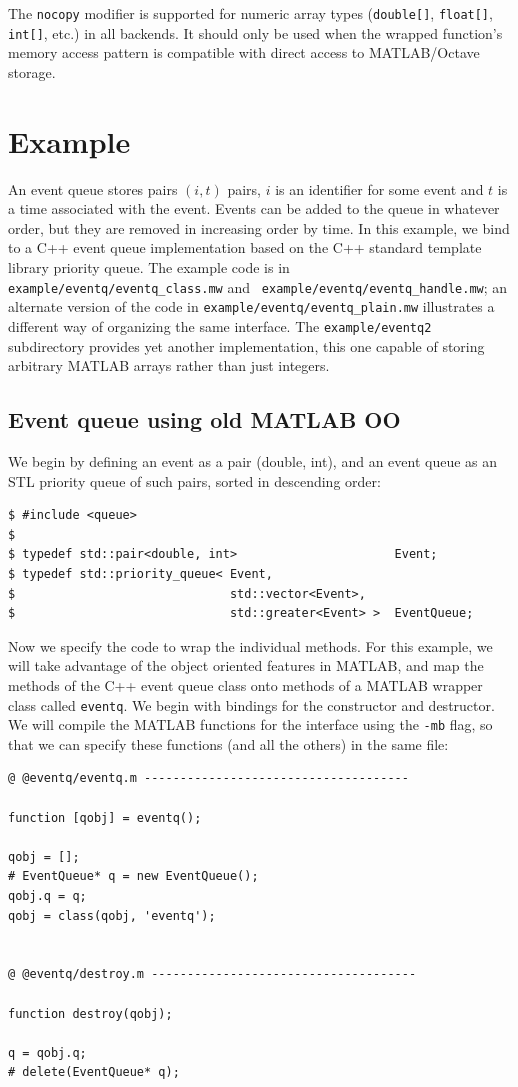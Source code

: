 \documentclass[12pt]{article}
\begin{document}
The {\tt nocopy} modifier is supported for numeric array types
({\tt double[]}, {\tt float[]}, {\tt int[]}, etc.) in all backends.
It should only be used when the wrapped function's memory access
pattern is compatible with direct access to MATLAB/Octave storage.


\section{Example}

An event queue stores pairs $(i, t)$ pairs, $i$ is an identifier for
some event and $t$ is a time associated with the event.  Events can be
added to the queue in whatever order, but they are removed in
increasing order by time.  In this example, we bind to a C++ event
queue implementation based on the C++ standard template library
priority queue.  The example code is in {\tt
  example/eventq/eventq\_class.mw} and {\tt
  example/eventq/eventq\_handle.mw}; an alternate version of the code
in {\tt example/eventq/eventq\_plain.mw} illustrates a different way
of organizing the same interface.  The {\tt example/eventq2}
subdirectory provides yet another implementation, this one capable of
storing arbitrary MATLAB arrays rather than just integers.

\subsection{Event queue using old MATLAB OO}

We begin by defining an event as a pair (double, int), and an
event queue as an STL priority queue of such pairs, sorted in
descending order:
\begin{verbatim}
$ #include <queue>
$
$ typedef std::pair<double, int>                      Event;
$ typedef std::priority_queue< Event,
$                              std::vector<Event>,
$                              std::greater<Event> >  EventQueue;
\end{verbatim}

Now we specify the code to wrap the individual methods.  For this
example, we will take advantage of the object oriented features in
MATLAB, and map the methods of the C++ event queue class onto methods
of a MATLAB wrapper class called {\tt eventq}.  We begin with bindings
for the constructor and destructor.  We will compile the MATLAB
functions for the interface using the {\tt -mb} flag, so that we can
specify these functions (and all the others) in the same file:
\begin{verbatim}
@ @eventq/eventq.m -------------------------------------

function [qobj] = eventq();

qobj = [];
# EventQueue* q = new EventQueue();
qobj.q = q;
qobj = class(qobj, 'eventq');


@ @eventq/destroy.m -------------------------------------

function destroy(qobj);

q = qobj.q;
# delete(EventQueue* q);
\end{verbatim}
\end{document}
